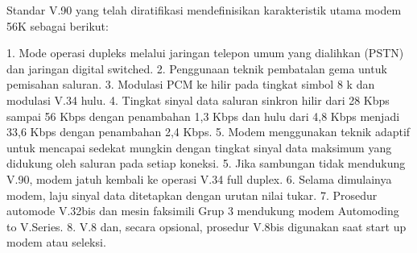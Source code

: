Standar V.90 yang telah diratifikasi mendefinisikan karakteristik utama modem 56K sebagai berikut:
 
 1. Mode operasi dupleks melalui jaringan telepon umum yang dialihkan (PSTN) dan jaringan digital switched.
 2. Penggunaan teknik pembatalan gema untuk pemisahan saluran.
 3. Modulasi PCM ke hilir pada tingkat simbol 8 k dan modulasi V.34 hulu.
 4. Tingkat sinyal data saluran sinkron hilir dari 28 Kbps sampai 56 Kbps dengan penambahan 1,3 Kbps dan hulu dari 4,8 Kbps                       menjadi 33,6 Kbps dengan penambahan 2,4 Kbps.
 5. Modem menggunakan teknik adaptif untuk mencapai sedekat mungkin dengan tingkat sinyal data maksimum yang didukung oleh   saluran pada setiap koneksi.
 5. Jika sambungan tidak mendukung V.90, modem jatuh kembali ke operasi V.34 full duplex.
 6. Selama dimulainya modem, laju sinyal data ditetapkan dengan urutan nilai tukar.
 7. Prosedur automode V.32bis dan mesin faksimili Grup 3 mendukung modem Automoding to V.Series.
 8. V.8 dan, secara opsional, prosedur V.8bis digunakan saat start up modem atau seleksi.
 
